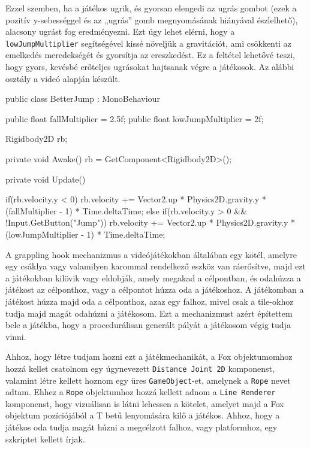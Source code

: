 Ezzel szemben, ha a játékos ugrik, és gyorsan elengedi az ugrás gombot (ezek a pozitív y-sebességgel és az „ugrás” gomb megnyomásának hiányával észlelhető), alacsony ugrást fog eredményezni. Ezt úgy lehet elérni, hogy a \texttt{lowJumpMultiplier} segítségével kissé növeljük a gravitációt, ami csökkenti az emelkedés meredekségét és gyorsítja az ereszkedést. Ez a feltétel lehetővé teszi, hogy gyors, kevésbé erőteljes ugrásokat hajtsanak végre a játékosok. Az alábbi osztály a \cite{betterjump} videó alapján készült.

\begin{java}
public class BetterJump : MonoBehaviour
{
    public float fallMultiplier = 2.5f;
    public float lowJumpMultiplier = 2f;

    Rigidbody2D rb;

    private void Awake()
    {
        rb = GetComponent<Rigidbody2D>();
    }

    private void Update()
    {
        if(rb.velocity.y < 0) 
        {
            rb.velocity += 
                Vector2.up * Physics2D.gravity.y * 
                (fallMultiplier - 1) * Time.deltaTime;
        }
        else if(rb.velocity.y > 0 && !Input.GetButton("Jump"))
        {
            rb.velocity += 
                Vector2.up * Physics2D.gravity.y * 
                (lowJumpMultiplier - 1) * Time.deltaTime;
        }
        
    }
}
\end{java}


A grappling hook mechanizmus a videójátékokban általában egy kötél, amelyre egy csáklya vagy valamilyen karommal rendelkező eszköz van ráerősítve, majd ezt a játékokban kilövik vagy eldobják, amely megakad a célpontban, és odahúzza a játékost az célponthoz, vagy a célpontot húzza oda a játékoshoz. A játékomban a játékost húzza majd oda a célponthoz, azaz egy falhoz, mivel csak a tile-okhoz tudja majd magát odahúzni a játékosom. Ezt a mechanizmust azért építettem bele a játékba, hogy a procedurálisan generált pályát a játékosom végig tudja vinni.

Ahhoz, hogy létre tudjam hozni ezt a játékmechanikát, a Fox objektumomhoz hozzá kellet csatolnom egy úgynevezett \texttt{Distance Joint 2D} komponenst, valamint létre kellett hoznom egy üres \texttt{GameObject}-et, amelynek a \texttt{Rope} nevet adtam. Ehhez a \texttt{Rope} objektumhoz hozzá kellett adnom a \texttt{Line Renderer} komponenst, hogy vizuálisan is látni lehessen a kötelet, amelyet majd a Fox objektum pozíciójából a T betű lenyomására kilő a játékos. Ahhoz, hogy a játékos oda tudja magát húzni a megcélzott falhoz, vagy platformhoz, egy szkriptet kellett írjak.

